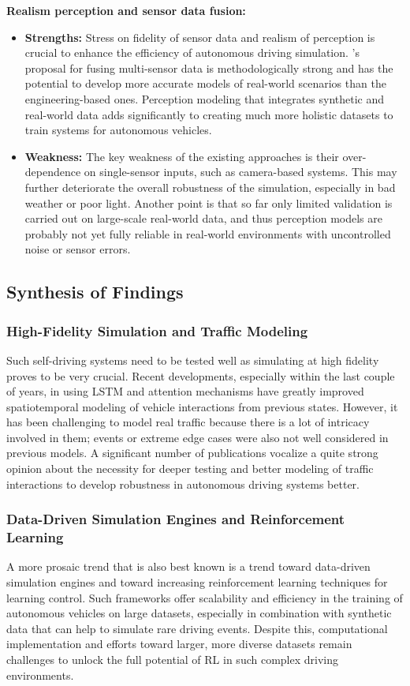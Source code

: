 \documentclass[lettersize,journal]{IEEEtran}
\begin{document}
\vspace{1em}

\textbf{Realism perception and sensor data fusion:}
\begin{itemize}
    \item \textbf{Strengths:} Stress on fidelity of sensor data and realism of perception is crucial to enhance the efficiency of autonomous driving simulation. \cite{ref2}'s proposal for fusing multi-sensor data is methodologically strong and has the potential to develop more accurate models of real-world scenarios than the engineering-based ones. Perception modeling that integrates synthetic and real-world data adds significantly to creating much more holistic datasets to train systems for autonomous vehicles.
    \item \textbf{Weakness:} The key weakness of the existing approaches is their over-dependence on single-sensor inputs, such as camera-based systems. This may further deteriorate the overall robustness of the simulation, especially in bad weather or poor light. Another point is that so far only limited validation is carried out on large-scale real-world data, and thus perception models are probably not yet fully reliable in real-world environments with uncontrolled noise or sensor errors.
\end{itemize}

\subsection{Synthesis of Findings}
\subsubsection{High-Fidelity Simulation and Traffic Modeling}
Such self-driving systems need to be tested well as simulating at high fidelity proves to be very crucial. Recent developments, especially within the last couple of years, in using LSTM and attention mechanisms have greatly improved spatiotemporal modeling of vehicle interactions from previous states. However, it has been challenging to model real traffic because there is a lot of intricacy involved in them; events or extreme edge cases were also not well considered in previous models. A significant number of publications vocalize a quite strong opinion about the necessity for deeper testing and better modeling of traffic interactions to develop robustness in autonomous driving systems better.

\subsubsection{Data-Driven Simulation Engines and Reinforcement Learning}
A more prosaic trend that is also best known is a trend toward data-driven simulation engines and toward increasing reinforcement learning techniques for learning control. Such frameworks offer scalability and efficiency in the training of autonomous vehicles on large datasets, especially in combination with synthetic data that can help to simulate rare driving events. Despite this, computational implementation and efforts toward larger, more diverse datasets remain challenges to unlock the full potential of RL in such complex driving environments.
\end{document}
